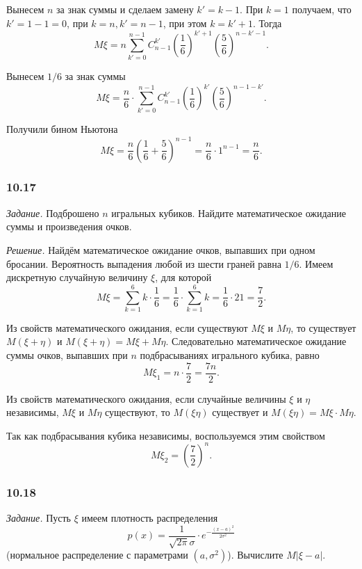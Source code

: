 Вынесем $n$ за знак суммы и сделаем замену $k' = k - 1$.
При $k = 1$ получаем, что $k' = 1 - 1 = 0$, при $k = n, k' = n - 1$, при этом $k = k' + 1$.
Тогда
$$M \xi =
n \sum \limits_{k'=0}^{n-1} C_{n-1}^{k'} \left( \frac{1}{6} \right)^{k'+1} \left( \frac{5}{6} \right)^{n-k'-1}.$$

Вынесем $1/6$ за знак суммы
$$M \xi =
\frac{n}{6} \cdot \sum \limits_{k'=0}^{n-1} C_{n-1}^{k'} \left( \frac{1}{6} \right)^{k'} \left( \frac{5}{6} \right)^{n-1-k'}.$$

Получили бином Ньютона
$$M \xi =
\frac{n}{6} \left( \frac{1}{6} + \frac{5}{6} \right)^{n-1} =
\frac{n}{6} \cdot 1^{n-1} =
\frac{n}{6}.$$

\subsubsection*{10.17}

\textit{Задание.} Подброшено $n$ игральных кубиков.
Найдите математическое ожидание суммы и произведения очков.

\textit{Решение.} Найдём математическое ожидание очков, выпавших при одном бросании.
Вероятность выпадения любой из шести граней равна $1/6$.
Имеем дискретную случайную величину $ \xi $, для которой
$$M \xi =
\sum \limits_{k=1}^6 k \cdot \frac{1}{6} =
\frac{1}{6} \cdot \sum \limits_{k=1}^6 k =
\frac{1}{6} \cdot 21 =
\frac{7}{2}.$$

Из свойств математического ожидания, если существуют $M \xi $ и $M \eta $, то существует $M \left( \xi + \eta \right) $ и $M \left( \xi + \eta \right) = M \xi + M \eta $.
Следовательно математическое ожидание суммы очков, выпавших при $n$ подбрасываниях игрального кубика, равно
$$M \xi_1 =
n \cdot \frac{7}{2} =
\frac{7n}{2}.$$

Из свойств математического ожидания,
если случайные величины $ \xi $ и $ \eta $ независимы,
$M \xi $ и $M \eta $ существуют, то $M \left( \xi \eta \right) $ существует и $M \left( \xi \eta \right) = M \xi \cdot M \eta $.

Так как подбрасывания кубика независимы, воспользуемся этим свойством
$$M \xi_2 =
\left( \frac{7}{2} \right)^n.$$

\subsubsection*{10.18}

\textit{Задание.} Пусть $ \xi $ имеем плотность распределения
$$p \left( x \right) =
\frac{1}{ \sqrt{2 \pi } \sigma } \cdot e^{- \frac{ \left( x-a \right)^2}{2 \sigma^2}}$$
(нормальное распределение с параметрами $ \left( a, \sigma^2 \right) $).
Вычислите $ M \left| \xi - a \right| $.

